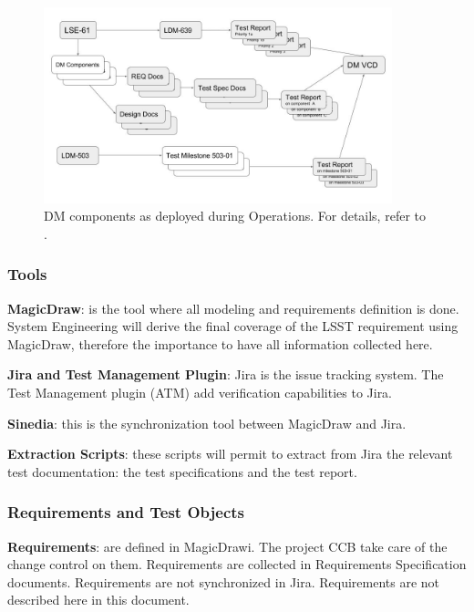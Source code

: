 \begin{figure}[htbp]
        \begin{center}
                \includegraphics[width=0.9\textwidth, trim={0cm 15cm 0cm 0cm}]{DMDocTreeStructure}
                \caption{DM components as deployed during Operations. For details, refer to .
                \label{fig:doctreestructure}}
        \end{center}
\end{figure}



\subsubsection{Tools}

{\bf MagicDraw}: is the tool where all modeling and requirements definition is done. System Engineering will derive the final coverage of the LSST requirement using MagicDraw, therefore the importance to have all information collected here.

{\bf Jira and Test Management Plugin}: Jira is the issue tracking system. The Test Management plugin (ATM) add verification capabilities to Jira.

{\bf Sinedia}: this is the synchronization tool between MagicDraw and Jira.

{\bf Extraction Scripts}: these scripts will permit to extract from Jira the relevant test documentation: the test specifications and the test report.


\subsubsection{Requirements and Test Objects}

{\bf Requirements}: are defined in MagicDrawi. The project CCB take care of the change control on them.
Requirements are collected in Requirements Specification documents.
Requirements are not synchronized in Jira.
Requirements are not described here in this document.

